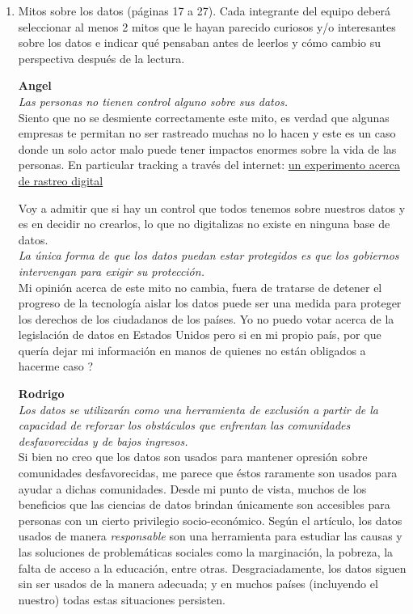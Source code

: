 \documentclass[12pt,a4paper]{article}
\begin{document}
\begin{enumerate}
\begin{enumerate}
				
				

			\item Mitos sobre los datos (páginas 17 a 27). Cada integrante del equipo deberá seleccionar al menos 2
				mitos que le hayan parecido curiosos y/o interesantes sobre los datos e indicar qué pensaban antes de
				leerlos y cómo cambio su perspectiva después de la lectura.

				\textbf{Angel}\\
				\textit{Las personas no tienen control alguno sobre sus datos.}\\

				Siento que no se desmiente correctamente este
				mito, es verdad que algunas empresas te permitan
				no ser rastreado muchas no lo hacen y este es
				un caso donde un solo actor malo
				puede tener impactos enormes sobre la vida de
				las personas. En particular tracking
				a través del internet: \href{https://coveryourtracks.eff.org/}{un experimento acerca de rastreo digital}

				Voy a admitir que si hay un control que todos
				tenemos sobre nuestros datos y es en decidir no
				crearlos, lo que no digitalizas no existe
				en ninguna base de datos.\\

				\textit{La única forma de que los datos puedan estar protegidos es que
				los gobiernos intervengan para exigir su protección.}\\

				Mi opinión acerca de este mito no cambia,
				fuera de tratarse de detener el progreso de la tecnología
				aislar los datos puede ser una medida para proteger los
				derechos de los ciudadanos de los países.
				Yo no puedo votar acerca de la legislación de datos
				en Estados Unidos pero si en mi propio país, por que
				quería dejar mi información en manos de quienes no
				están obligados a hacerme caso ?
				
				\pagebreak
				\textbf{Rodrigo}\\
				\textit {Los datos se utilizarán como una herramienta de exclusión a 
				partir de la capacidad de reforzar los obstáculos que enfrentan 
				las comunidades desfavorecidas y de bajos ingresos.} \\
				
				Si bien no creo que los datos son usados para mantener opresión sobre 
				comunidades desfavorecidas, me parece que éstos raramente son usados para
				ayudar a dichas comunidades. Desde mi punto de vista, muchos de los beneficios 
				que las ciencias de datos brindan únicamente son accesibles para personas con un 
				cierto privilegio socio-económico. Según el artículo, los datos usados de manera 
				\textit{responsable} son una herramienta para estudiar las causas y las soluciones 
				de problemáticas sociales como la marginación, la pobreza, la falta de acceso a la educación,
				entre otras. Desgraciadamente, los datos siguen sin ser usados de la manera adecuada; 
				y en muchos países (incluyendo el nuestro) todas estas situaciones persisten. \\
				

\end{enumerate}
\end{enumerate}
\end{document}
